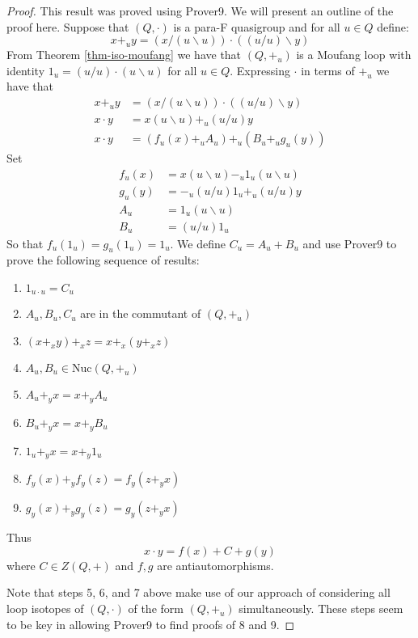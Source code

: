 \documentclass[12pt, twoside, openright]{report}
\theoremstyle{definition}
\newcommand{\ldv}{\backslash}       %
\newcommand{\rdv}{/}                %
\newcommand{\nuc}{\text{Nuc}}       %
\begin{document}
\begin{proof}
  This result was proved using Prover9. We will present an outline of the proof here.
  Suppose that $(Q, \cdot)$ is a para-F quasigroup and for all $u\in Q$ define:
  \[x +_u y = (x\rdv(u\ldv u))\cdot ((u\rdv u)\ldv y)\]
  From Theorem \ref{thm-iso-moufang} we have that $(Q, +_u)$ is a Moufang loop with
    identity $1_u = (u\rdv u)\cdot (u\ldv u)$ for all $u\in Q$. Expressing $\cdot$ in terms
    of $+_u$  we have that
  \begin{align*}
    x +_u y &= (x\rdv(u\ldv u))\cdot ((u\rdv u)\ldv y)\\
    x\cdot y &= x(u\ldv u) +_u (u\rdv u)y\\
    x\cdot y &= (f_u(x) +_u A_u) +_u (B_u +_u g_u(y))
  \end{align*}
  Set
  \begin{align*}
    f_u(x) &= x(u\ldv u) -_u 1_u(u\ldv u)\\
    g_u(y) &= -_u(u\rdv u)1_u +_u (u\rdv u)y\\
    A_u &= 1_u(u\ldv u)\\
    B_u &= (u\rdv u) 1_u
  \end{align*}
    So that $f_u(1_u) = g_u(1_u) = 1_u$. We define $C_u = A_u + B_u$ and use Prover9 to prove
      the following sequence of results:
\begin{enumerate}
  \item $1_{u\cdot u} = C_u$
  \item $A_u, B_u, C_u$ are in the commutant of $(Q, +_u)$
  \item $(x +_x y) +_x z = x +_x (y +_x z)$
  \item $A_u, B_u\in\nuc(Q, +_u)$
  \item $A_u +_y x = x +_y A_u$
  \item $B_u +_y x = x +_y B_u$
  \item $1_u +_y x = x +_y 1_u$
  \item $f_y(x) +_y f_y(z) = f_y(z +_y x)$
  \item $g_y(x) +_y g_y(z) = g_y(z +_y x)$
\end{enumerate}

  Thus
  \[x\cdot y = f(x) + C + g(y)\]
  where $C\in Z(Q, +)$ and $f, g$ are antiautomorphisms.

  Note that steps 5, 6, and 7 above make use of our approach of considering all loop isotopes of
    $(Q, \cdot)$ of the form $(Q, +_u)$ simultaneously. These steps seem to be key in allowing
    Prover9 to find proofs of 8 and 9.
\end{proof}
\end{document}
